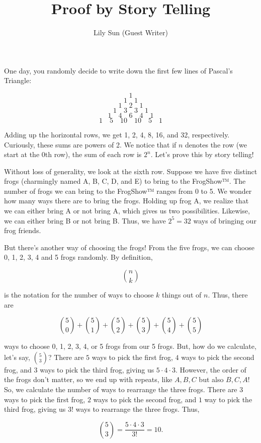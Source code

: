 \documentclass{article}
\title{Proof by Story Telling}
\author{Lily Sun (Guest Writer)}
\date{}
\begin{document}
\maketitle

One day, you randomly decide to write down the first few lines of Pascal's Triangle:

$$                   1$$
$$                  1\quad1$$
$$                 1\quad2\quad1$$
$$                1\quad3\quad3\quad1$$
$$               1\quad4\quad6\quad4\quad1$$
$$              1\quad5\quad10\quad10\quad5\quad1$$

Adding up the horizontal rows, we get 1, 2, 4, 8, 16, and 32, respectively. Curiously, these sums are powers of 2. We notice that if $n$ denotes the row (we start at the 0th row), the sum of each row is $2^n$. Let's prove this by story telling!

Without loss of generality, we look at the sixth row. Suppose we have five distinct frogs (charmingly named A, B, C, D, and E) to bring to the FrogShow™. The number of frogs we can bring to the FrogShow™ ranges from 0 to 5. We wonder how many ways there are to bring the frogs. Holding up frog A, we realize that we can either bring A or not bring A, which gives us two possibilities. Likewise, we can either bring B or not bring B. Thus, we have $2^5 = 32$ ways of bringing our frog friends.

But there's another way of choosing the frogs! From the five frogs, we can choose 0, 1, 2, 3, 4 and 5 frogs randomly. By definition, 

$$n \choose k$$

is the notation for the number of ways to choose $k$ things out of $n$. Thus, there are 

$${5 \choose 0}+{5 \choose 1}+{5 \choose 2}+{5 \choose 3}+{5 \choose 4}+{5 \choose 5}$$

ways to choose 0, 1, 2, 3, 4, or 5 frogs from our 5 frogs. But, how do we calculate, let's say, $5 \choose 3$? There are $5$ ways to pick the first frog, $4$ ways to pick the second frog, and $3$ ways to pick the third frog, giving us $5 \cdot 4 \cdot 3$. However, the order of the frogs don't matter, so we end up with repeats, like $A, B, C$ but also $B, C, A$! So, we calculate the number of ways to rearrange the three frogs. There are $3$ ways to pick the first frog, $2$ ways to pick the second frog, and $1$ way to pick the third frog, giving us $3!$ ways to rearrange the three frogs. Thus, 

$${5 \choose 3} = \dfrac{5 \cdot 4 \cdot 3}{3!} = 10.$$
\end{document}
